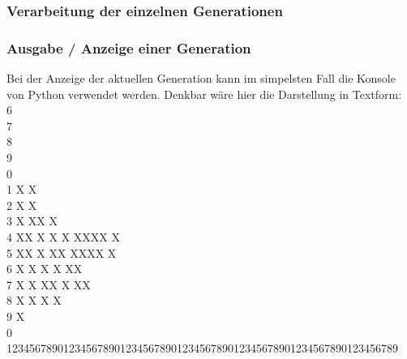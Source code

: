 \subsubsection{Verarbeitung der einzelnen Generationen}

\subsubsection{Ausgabe / Anzeige einer Generation}
Bei der Anzeige der aktuellen Generation kann im simpelsten Fall die Konsole von Python verwendet werden. Denkbar wäre hier die Darstellung in Textform:\\ %
6\\
7\\
8\\
9\\
0\\
1 				X											X\\
2              X                    X\\
3 		X 	XX 	X\\
4 				XX 		X X				X XXXX X\\
5 				XX 	X 	XX 		XXXX 				X\\
6 		X 	X X X XX\\
7 				X X			XX		X XX\\
8 				X			X	X				X\\
9 				X\\
0\\
123456789012345678901234567890123456789012345678901234567890123456789\\

